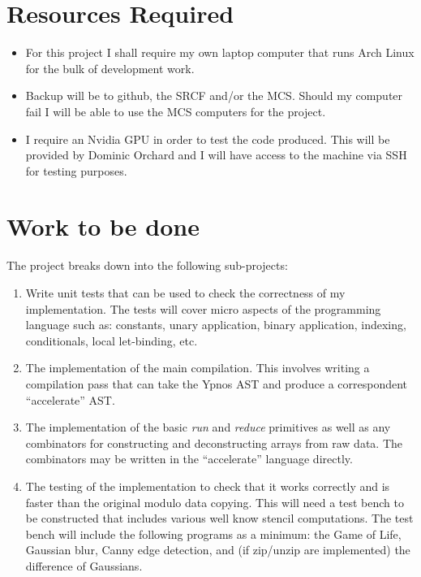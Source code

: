 \section*{Resources Required}

\begin{itemize} 

\item For this project I shall require my own laptop computer that runs Arch 
Linux for the bulk of development work. 

\item Backup will be to github, the SRCF and/or the MCS. Should my computer 
fail I will be able to use the MCS computers for the project.

\item I require an Nvidia GPU in order to test the code produced. This will be 
provided by Dominic Orchard and I will have access to the machine via SSH for 
testing purposes.

\end{itemize}

\section*{Work to be done}

The project breaks down into the following sub-projects:

\begin{enumerate}

\item Write unit tests that can be used to check the correctness of my 
implementation. The tests will cover micro aspects of the programming language 
such as: constants, unary application, binary application, indexing, 
conditionals, local let-binding, etc.

\item The implementation of the main compilation. This involves writing a 
compilation pass that can take the Ypnos AST and produce a correspondent 
``accelerate'' AST.

\item The implementation of the basic \emph{run} and \emph{reduce} primitives 
as well as any combinators for constructing and deconstructing arrays from raw 
data. The combinators may be written in the ``accelerate'' language directly.

\item The testing of the implementation to check that it works correctly and is 
faster than the original modulo data copying. This will need a test bench to be 
constructed that includes various well know stencil computations. The test 
bench will include the following programs as a minimum: the Game of Life, 
Gaussian blur, Canny edge detection, and (if zip/unzip are implemented) the 
difference of Gaussians.

\end{enumerate}

